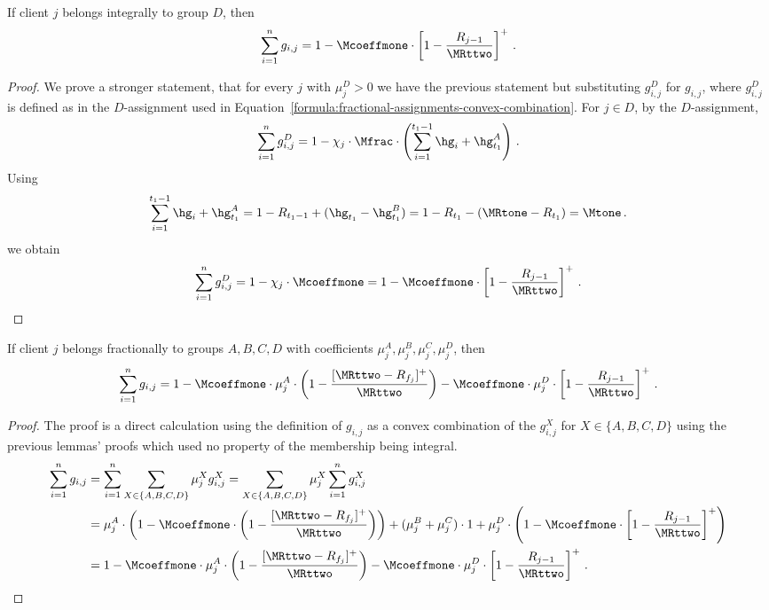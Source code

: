 \begin{lemma}\label{lem:gen-D}
    If client $j$ belongs integrally to group $D$, then
    \begin{equation*}
       \sum_{i=1}^n g_{i,j} = 1 - \Mcoeffmone \cdot \left[1 - \frac{R_{j-1}}{\MRttwo}\right]^+\,.
    \end{equation*}
\end{lemma}
\begin{proof}
    We prove a stronger statement, that for every $j$ with $\mu_j^D > 0$ we have the previous statement but substituting $g_{i,j}^D$ for $g_{i,j}$, where $g_{i,j}^D$ is defined as in the $D$-assignment used in Equation~\ref{formula:fractional-assignments-convex-combination}.
    For $j \in D$, by the $D$-assignment,
    \begin{equation*}
        \sum_{i=1}^n g_{i,j}^D = 1 - \chi_j \cdot \Mfrac \cdot \left(\sum_{i=1}^{t_1-1} \hg_i + \hg_{t_1}^A\right)\,.
    \end{equation*}
    Using
    \begin{equation*}
        \sum_{i=1}^{t_1-1} \hg_i + \hg_{t_1}^A = 1 - R_{t_1 - 1} + (\hg_{t_1} - \hg_{t_1}^B) = 1 - R_{t_1} - (\MRtone - R_{t_1}) = \Mtone\,.
    \end{equation*}
    we obtain
    \begin{equation*}
        \sum_{i=1}^n g_{i,j}^D = 1 - \chi_j \cdot \Mcoeffmone
        = 1 - \Mcoeffmone \cdot \left[1 - \frac{R_{j-1}}{\MRttwo}\right]^+\,.
    \end{equation*}
\end{proof}

\begin{lemma}\label{lem:gen-fractional}
    If client $j$ belongs fractionally to groups $A,B,C,D$ with coefficients $\mu_j^A, \mu_j^B, \mu_j^C, \mu_j^D$, then
    \begin{equation*}
        \sum_{i=1}^n g_{i,j} = 1 - \Mcoeffmone \cdot \mu_j^A \cdot \left(1 - \frac{[\MRttwo - R_{f_j}]^+}{\MRttwo}\right) - \Mcoeffmone \cdot \mu_j^D \cdot \left[1 - \frac{R_{j-1}}{\MRttwo}\right]^+\,.
    \end{equation*}
\end{lemma}
\begin{proof}
    The proof is a direct calculation using the definition of $g_{i,j}$ as a convex combination of the $g_{i,j}^X$ for $X \in \{A,B,C,D\}$ using the previous lemmas' proofs which used no property of the membership being integral.
    \begin{align*}
        \sum_{i=1}^n g_{i,j}
        &= \sum_{i=1}^n \sum_{X\in\{A,B,C,D\}} \mu_j^X g_{i,j}^X
        = \sum_{X\in\{A,B,C,D\}} \mu_j^X \sum_{i=1}^n g_{i,j}^X \\
        &= \mu_j^A \cdot \left(1 - \Mcoeffmone \cdot \left(1 - \frac{[\MRttwo - R_{f_j}]^+}{\MRttwo}\right)\right) + (\mu_j^B + \mu_j^C) \cdot 1 + \mu_j^D \cdot \left(1 - \Mcoeffmone \cdot \left[1 - \frac{R_{j-1}}{\MRttwo}\right]^+\right)\\
        &= 1 - \Mcoeffmone \cdot \mu_j^A \cdot \left(1 - \frac{[\MRttwo - R_{f_j}]^+}{\MRttwo}\right) - \Mcoeffmone \cdot \mu_j^D \cdot \left[1 - \frac{R_{j-1}}{\MRttwo}\right]^+\,.
    \end{align*}
\end{proof}

